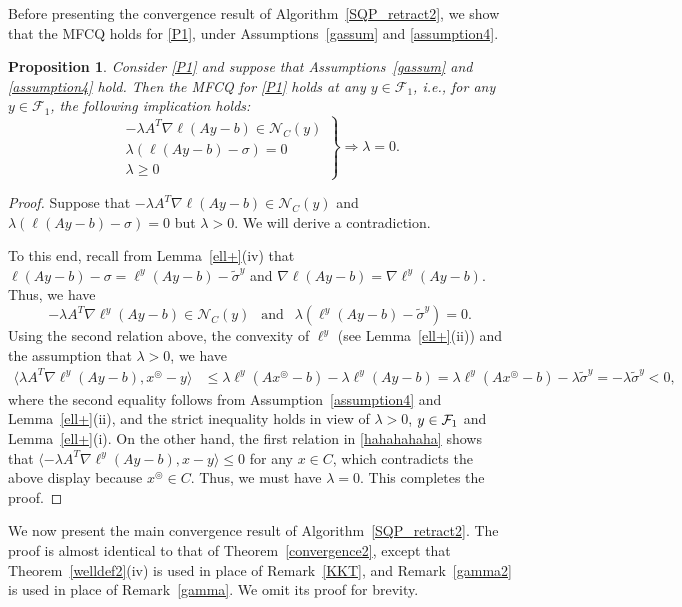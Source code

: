 \documentclass[10pt]{article}
\numberwithin{equation}{section}
\newtheorem{proposition}{Proposition}[section]
\def\xfeasss{x^\circledcirc}
\begin{document}
Before presenting the convergence result of Algorithm~\ref{SQP_retract2}, we show that the MFCQ holds for \eqref{P1}, under Assumptions~\ref{gassum} and \ref{assumption4}.
\begin{proposition}\label{MFCQ}
Consider \eqref{P1} and suppose that Assumptions~\ref{gassum} and \ref{assumption4} hold. Then the MFCQ for \eqref{P1} holds at any $y\in \mathcal{F}_1$, i.e., for any $y\in \mathcal{F}_1$, the following implication holds:
\[
\left.\begin{matrix}
-\lambda A^T\nabla\ell(Ay - b)\in \mathcal{N}_C(y)\\
\lambda(\ell(Ay - b) -\sigma) =0\\
\lambda\geq 0
\end{matrix}\right\} \Rightarrow\lambda =0.
\]
\end{proposition}
\begin{proof}
Suppose that $-\lambda A^T\nabla\ell(Ay - b)\in \mathcal{N}_C(y)$ and $\lambda(\ell(Ay - b) -\sigma) =0$ but $\lambda > 0$. We will derive a contradiction.

To this end, recall from Lemma~\ref{ell+}(iv) that $\ell(Ay - b) - \sigma = \ell^y(Ay - b) - \tilde{\sigma}^y$ and $\nabla\ell(Ay - b) = \nabla\ell^y(Ay - b)$. Thus, we have
 \begin{equation}\label{hahahahaha}
 -\lambda A^T\nabla\ell^y(Ay - b)\in \mathcal{N}_C(y)\  \ \text{ and }\  \ \lambda(\ell^y(Ay - b) - \tilde{\sigma}^y) =0.
 \end{equation}
Using the second relation above, the convexity of $\ell^y$ (see Lemma~\ref{ell+}(ii)) and the assumption that $\lambda > 0$, we have
 \[
 \begin{aligned}
\langle\lambda A^T\nabla\ell^y(Ay - b), \xfeasss - y\rangle &\leq \lambda\ell^y(A\xfeasss - b) - \lambda\ell^y(Ay - b)  = \lambda\ell^y(A\xfeasss - b)-  \lambda\tilde{\sigma}^y = -  \lambda\tilde{\sigma}^y < 0,
 \end{aligned}
 \]
where the second equality follows from Assumption~\ref{assumption4} and Lemma~\ref{ell+}(ii), and the strict inequality holds in view of $\lambda > 0$, $y\in {\cal F}_1$ and Lemma~\ref{ell+}(i).
On the other hand, the first relation in \eqref{hahahahaha} shows that $\langle-\lambda A^T\nabla\ell^y(Ay - b), x - y\rangle\leq 0$ for any $x\in C$, which contradicts the above display because $\xfeasss\in C$. Thus, we must have $\lambda = 0$. This completes the proof.
\end{proof}
We now present the main convergence result of Algorithm~\ref{SQP_retract2}. The proof is almost identical to that of Theorem~\ref{convergence2}, except that Theorem~\ref{welldef2}(iv) is used in place of Remark~\ref{KKT}, and Remark~\ref{gamma2} is used in place of Remark~\ref{gamma}. We omit its proof for brevity.
\end{document}
